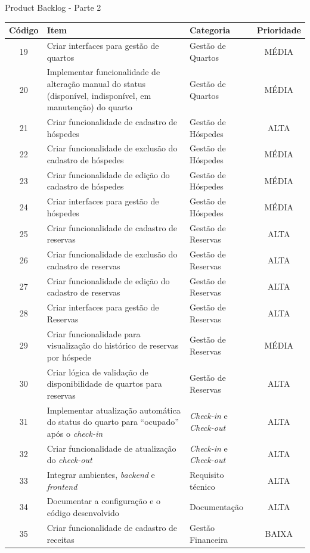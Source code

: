 \documentclass[
	12pt,				%
	openany,			%
	oneside,			%
	a4paper,			%
	english,			%
	french,				%
	spanish,			%
	brazil				%
	]{abntex2}
\begin{document}
%
\begin{quadro}[H]
	\caption{Product Backlog - Parte 2}
	\label{product_backlog_2}
	\begin{tabular}{|c|p{6.5cm}|p{3.8cm}|c|}
		\hline
		\textbf{Código} & \textbf{Item} & \textbf{Categoria} & \textbf{Prioridade} \\	\hline	
		19 & Criar interfaces para gestão de quartos & Gestão de Quartos & MÉDIA \\ \hline
		20 & Implementar funcionalidade de alteração manual do status (disponível, indisponível, em manutenção) do quarto & Gestão de Quartos & MÉDIA \\ \hline
		21 & Criar funcionalidade de cadastro de hóspedes &	Gestão de Hóspedes & ALTA \\ \hline
		22 & Criar funcionalidade de exclusão do cadastro de hóspedes &
		Gestão de Hóspedes & MÉDIA \\ \hline
		23 & Criar funcionalidade de edição do cadastro de hóspedes &
		Gestão de Hóspedes & MÉDIA \\ \hline
		24 & Criar interfaces para gestão de hóspedes &	Gestão de Hóspedes & MÉDIA \\ \hline
		25 & Criar funcionalidade de cadastro de reservas &	Gestão de Reservas & ALTA \\ \hline
		26 & Criar funcionalidade de exclusão do cadastro de reservas &
		Gestão de Reservas & ALTA \\ \hline
		27 & Criar funcionalidade de edição do cadastro de reservas &
		Gestão de Reservas & ALTA \\ \hline
		28 & Criar interfaces para gestão de Reservas &	Gestão de Reservas & ALTA \\ \hline
		29 & Criar funcionalidade para visualização do histórico de reservas por hóspede & Gestão de Reservas &	MÉDIA \\ \hline
		30 & Criar lógica de validação de disponibilidade de quartos para reservas & Gestão de Reservas & ALTA \\ \hline
		31 & Implementar atualização automática do status do quarto para “ocupado” após o \textit {check-in} & \textit {Check-in} e \textit {Check-out} & ALTA 
		\\ \hline
		32 & Criar funcionalidade de atualização do \textit {check-out} &
		\textit {Check-in} e \textit {Check-out} &	ALTA \\ \hline
		33 & Integrar ambientes, \textit{backend} e \textit {frontend} &	Requisito técnico & ALTA \\ \hline
		34 & Documentar a configuração e o código desenvolvido &
		Documentação & ALTA \\ \hline
		35 & Criar funcionalidade de cadastro de receitas &	Gestão Financeira & BAIXA \\ \hline
	\end{tabular}
\end{quadro}
\end{document}
